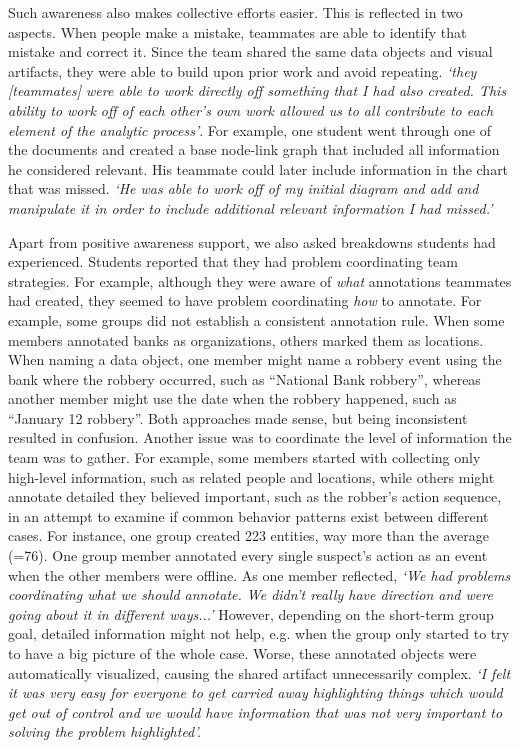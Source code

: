 Such awareness also makes collective efforts easier. This is reflected in two aspects. When people make a mistake, teammates are able to identify that mistake and correct it. 
Since the team shared the same data objects and visual artifacts, they were able to build upon prior work and avoid repeating. 
\textit{`they [teammates] were able to work directly off something that I had also created. This ability to work off of each other’s own work allowed us to all contribute to each element of the analytic process'}. For example, one student went through one of the documents and created a base node-link graph that included all information he considered relevant. His teammate could later include information in the chart that was missed. 
\textit{`He was able to work off of my initial diagram and add and manipulate it in order to include additional relevant information I had missed.'}



Apart from positive awareness support, we also asked breakdowns students had experienced. Students reported that they had problem coordinating team strategies. For example, although they were aware of \textit{what} annotations teammates had created, they seemed to have problem coordinating \emph{how} to annotate. For example, some groups did not establish a consistent annotation rule. When some members annotated banks as organizations, others marked them as locations. When naming a data object, one member might name a robbery event using the bank where the robbery occurred, such as ``National Bank robbery'', whereas another member might use the date when the robbery happened, such as ``January 12 robbery''. Both approaches made sense, but being inconsistent resulted in confusion. 
Another issue was to coordinate the level of information the team was to gather. For example, some members started with collecting only high-level information, such as related people and locations, while others might annotate detailed they believed important, such as the robber's action sequence, in an attempt to examine if common behavior patterns exist between different cases. For instance, one group created 223 entities, way more than the average (=76). One group member annotated every single suspect's action as an event when the other members were offline. As one member reflected,
\textit{`We had problems coordinating what we should annotate. We didn't really have direction and were going about it in different ways...'}
However, depending on the short-term group goal, detailed information might not help, e.g. when the group only started to try to have a big picture of the whole case. Worse, these annotated objects were automatically visualized, causing the shared artifact unnecessarily complex. 
\textit{`I felt it was very easy for everyone to get carried away highlighting things which would get out of control and we would have information that was not very important to solving the problem highlighted'.}


